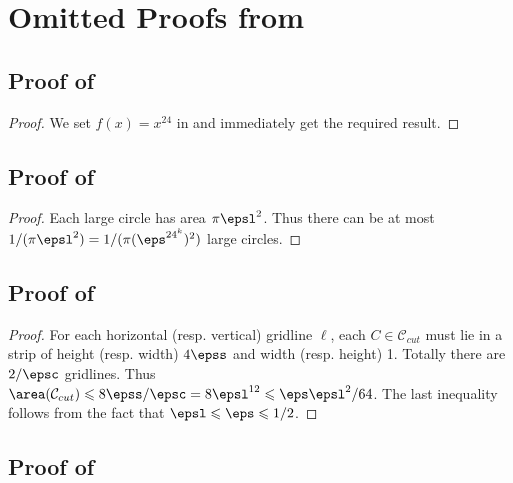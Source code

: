 \section{Omitted Proofs from }

\subsection{Proof of }
\begin{proof}
We set $f(x)=x^{24}$ in  and immediately get the required result.
\end{proof}
\subsection{Proof of }
\begin{proof}
	Each large circle has area $\pi \epsl^2$. Thus there can be at most $1/(\pi \epsl^2)= 1/(\pi ({\eps^{{24}^k})^2})$ large circles. 
\end{proof}
\subsection{Proof of }
	
\begin{proof}
	For each horizontal (resp. vertical) gridline $\ell$, each $C \in \mathcal{C}_{cut}$ must lie in a strip of height (resp. width) $4\epss$ and width (resp. height) 1. Totally there are $2/\epsc$ gridlines.
	Thus $\area(\mathcal{C}_{cut}) \leqslant 8 \epss/\epsc = 8 \epsl^{12}  \leqslant  \eps \epsl^2/64$. The last inequality follows from the fact that $\epsl \leqslant \eps \leqslant 1/2$.
\end{proof}

\subsection{Proof of }

